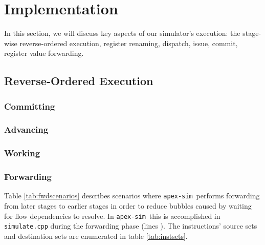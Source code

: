 \documentclass[12pt]{article}
\newcommand{\codename}[0]{\texttt{apex-sim}~}
\begin{document}
\section{Implementation}
\label{sec:implementation}
In this section, we will discuss key aspects of our simulator's execution: the stage-wise reverse-ordered execution, register renaming, dispatch, issue, commit, register value forwarding.

\subsection{Reverse-Ordered Execution}

\subsubsection{Committing}


\subsubsection{Advancing}

\subsubsection{Working}

\subsubsection{Forwarding}
Table \ref{tab:fwdscenarios} describes scenarios where \codename performs forwarding from later stages to earlier stages in order to reduce bubbles caused by waiting for flow dependencies to resolve. In \codename this is accomplished in \texttt{simulate.cpp} during the forwarding phase (lines ). The instructions' source sets and destination sets are enumerated in table \ref{tab:instsets}.
\end{document}
